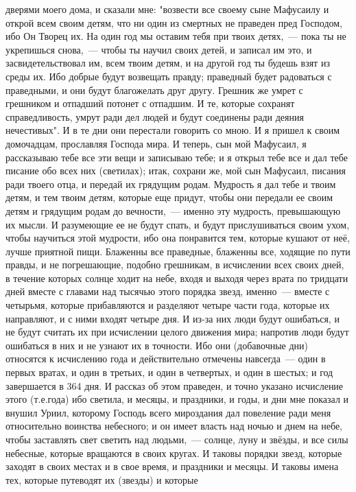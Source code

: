 дверями моего дома, и сказали мне: "возвести все своему сыне Мафусаилу и открой
всем своим детям, что ни один из смертных не праведен пред Господом, ибо Он
Творец их.
На один год мы оставим тебя при твоих детях,~--- пока ты не укрепишься
снова,~--- чтобы ты научил своих детей, и записал им это, и засвидетельствовал
им, всем твоим детям, и на другой год ты будешь взят из среды их.
Ибо добрые будут возвещать правду; праведный будет радоваться с
праведными, и они будут благожелать друг другу.
Грешник же умрет с грешником и отпадший потонет с отпадшим.
И те, которые сохранят справедливость, умрут ради дел людей и будут
соединены ради деяния нечестивых".
И в те дни они перестали говорить со мною.
И я пришел к своим домочадцам, прославляя Господа мира.
И теперь, сын мой Мафусаил, я рассказываю тебе все эти вещи и
записываю тебе; и я открыл тебе все и дал тебе писание обо всех них (светилах);
итак, сохрани же, мой сын Мафусаил, писания ради твоего отца, и передай их
грядущим родам.
Мудрость я дал тебе и твоим детям, и тем твоим детям, которые еще
придут, чтобы они передали ее своим детям и грядущим родам до вечности,~---
именно эту мудрость, превышающую их мысли.
И разумеющие ее не будут спать, и будут прислушиваться своим ухом,
чтобы научиться этой мудрости, ибо она понравится тем, которые кушают от неё,
лучше приятной пищи.
Блаженны все праведные, блаженны все, ходящие по пути правды, и не
погрешающие, подобно грешникам, в исчислении всех своих дней, в течение которых
солнце ходит на небе, входя и выходя через врата по тридцати дней вместе с
главами над тысячью этого порядка звезд, именно~--- вместе с четырьмя, которые
прибавляются и разделяют четыре части года, которые их направляют, и с ними
входят четыре дня.
И из-за них люди будут ошибаться, и не будут считать их при исчислении
целого движения мира; напротив люди будут ошибаться в них и не узнают их в
точности.
Ибо они (добавочные дни) относятся к исчислению года и действительно
отмечены навсегда~--- один в первых вратах, и один в третьих, и один в четвертых,
и один в шестых; и год завершается в 364 дня.
И рассказ об этом праведен, и точно указано исчисление этого
(т.е.года) ибо светила, и месяцы, и праздники, и годы, и дни мне показал и
внушил Уриил, которому Господь всего мироздания дал повеление ради меня
относительно воинства небесного; и он имеет власть над ночью и днем на небе,
чтобы заставлять свет светить над людьми,~--- солнце, луну и звёзды, и все силы
небесные, которые вращаются в своих кругах.
И таковы порядки звезд, которые заходят в своих местах и в свое время,
и праздники и месяцы.
И таковы имена тех, которые путеводят их (звезды) и которые
